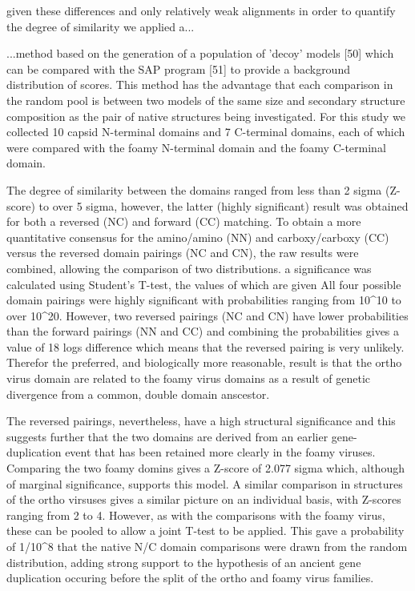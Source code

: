 
given these differences and only relatively weak alignments in order to quantify the
degree of similarity we applied a... 

...method based on the generation of a population of 'decoy' models [50] which can
be compared with the SAP program [51] to provide a background distribution of scores.
This method has the advantage that each comparison in the random pool is between
two models of the same size and secondary structure composition as the pair of native structures
being investigated.
For this study we collected 10 capsid N-terminal domains and 7 C-terminal domains, each of which 
were compared with the foamy N-terminal domain and the foamy C-terminal domain.

The degree of similarity between the domains ranged from less than 2 sigma (Z-score)
to over 5 sigma, however, the latter (highly significant) result was obtained for both
a reversed (NC) and forward (CC) matching.  To obtain a more quantitative consensus
for the amino/amino (NN) and carboxy/carboxy (CC) versus the reversed domain pairings
(NC and CN), the raw results were combined, allowing the comparison of two distributions.
a significance was calculated using Student's T-test, the values of which are given
All four possible domain pairings were highly significant with probabilities ranging
from 10^10 to over 10^20.   However, two reversed pairings (NC and CN) have lower probabilities
than the forward pairings (NN and CC) and combining the probabilities 
gives a value of 18 logs difference which means that the reversed pairing is
very unlikely.
Therefor the preferred, and biologically more reasonable, result is that the ortho virus
domain are related to the foamy virus domains as a result of genetic divergence from
a common, double domain anscestor. 

The reversed pairings, nevertheless, have a high structural significance and this suggests
further that the two domains are derived from an earlier gene-duplication event that has
been retained more clearly in the foamy viruses.   Comparing the two foamy domins gives
a Z-score of 2.077 sigma which, although of marginal significance, supports this model.
A similar comparison in structures of the ortho virsuses gives a
similar picture on an individual basis, with Z-scores ranging from 2 to 4.  However,
as with the comparisons with the foamy virus, these can be pooled to allow a joint
T-test to be applied.   This gave a probability of 1/10^8 that the native N/C domain
comparisons were drawn from the random distribution, adding strong support to the
hypothesis of an ancient gene duplication occuring before the split of the ortho 
and foamy virus families.
